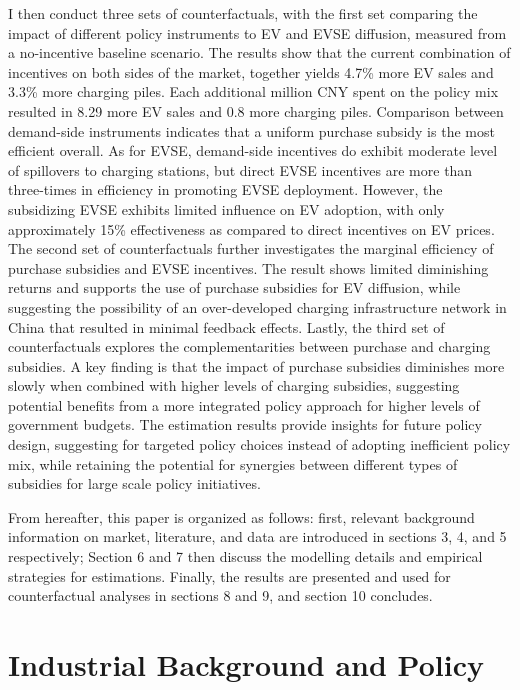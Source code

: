 \documentclass[12pt]{article}
\begin{document}
I then conduct three sets of counterfactuals, with the first set comparing the impact of different policy instruments to EV and EVSE diffusion,
measured from a no-incentive baseline scenario. The results show that the current combination of incentives on both sides of the market, together yields 4.7\% more EV sales and 3.3\% more charging piles.
Each additional million CNY spent on the policy mix resulted in 8.29 more EV sales and 0.8 more charging piles.
Comparison between demand-side instruments indicates that a uniform purchase subsidy is the most efficient overall.
As for EVSE, demand-side incentives do exhibit moderate level of spillovers to charging stations, but direct EVSE incentives are more than three-times in efficiency in promoting EVSE deployment.
However, the subsidizing EVSE exhibits limited influence on EV adoption, with only approximately 15\% effectiveness as compared to direct incentives on EV prices.
The second set of counterfactuals further investigates the marginal efficiency of purchase subsidies and EVSE incentives.
The result shows limited diminishing returns and supports the use of purchase subsidies for EV diffusion,
while suggesting the possibility of an over-developed charging infrastructure network in China that resulted in minimal feedback effects.
Lastly, the third set of counterfactuals explores the complementarities between purchase and charging subsidies.
A key finding is that the impact of purchase subsidies diminishes more slowly when combined with higher levels of charging subsidies,
suggesting potential benefits from a more integrated policy approach for higher levels of government budgets.
The estimation results provide insights for future policy design, suggesting for targeted policy choices instead of adopting inefficient policy mix,
while retaining the potential for synergies between different types of subsidies for large scale policy initiatives.

From hereafter, this paper is organized as follows: first, relevant background information on market, literature, and data are introduced in sections 3, 4, and 5 respectively;
Section 6 and 7 then discuss the modelling details and empirical strategies for estimations. Finally, the results are presented and used for counterfactual analyses in sections 8 and 9,
and section 10 concludes.


\section{Industrial Background and Policy}
\end{document}
